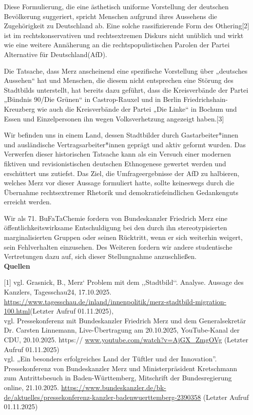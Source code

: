 \documentclass[DIV=calc]{scrartcl}
\let\oldgrqq=\grqq
\def\grqq{\oldgrqq\xspace}
\begin{document}
Diese Formulierung, die eine ästhetisch uniforme Vorstellung der deutschen Bevölkerung suggeriert, 
spricht Menschen aufgrund ihres Aussehens die Zugehörigkeit zu Deutschland ab. Eine solche 
rassifizierende Form des Othering[2] ist im rechtskonservativen und rechtsextremen Diskurs nicht 
unüblich und wirkt wie eine weitere Annäherung an die rechtspopulistischen Parolen der Partei 
\glqq Alternative für Deutschland\grqq (AfD).

Die Tatsache, dass Merz anscheinend eine spezifische Vorstellung über „deutsches Aussehen“ hat und 
Menschen, die diesem nicht entsprechen eine Störung des Stadtbilds unterstellt, hat bereits dazu geführt, 
dass die Kreisverbände der Partei „Bündnis 90/Die Grünen“ in Castrop-Rauxel und in Berlin 
Friedrichshain-Kreuzberg wie auch die Kreisverbände der Partei „Die Linke“ in Bochum und Essen und 
Einzelpersonen ihn wegen Volksverhetzung angezeigt haben.[3]

Wir befinden uns in einem Land, dessen Stadtbilder durch Gastarbeiter*innen und ausländische 
Vertragsarbeiter*innen geprägt und aktiv geformt wurden. Das Verwerfen dieser historischen Tatsache 
kann als ein Versuch einer modernen fiktiven und revisionistischen \glqq deutschen \grqq Ethnogenese gewertet 
werden und erschüttert uns zutiefst. Das Ziel, die Umfrageergebnisse der AfD zu halbieren, welches Merz 
vor dieser Aussage formuliert hatte, sollte keineswegs durch die Übernahme rechtsextremer Rhetorik und 
demokratiefeindlichen Gedankenguts erreicht werden.

Wir als 71. BuFaTaChemie fordern von Bundeskanzler Friedrich Merz eine öffentlichkeitswirksame 
Entschuldigung bei den durch ihn stereotypisierten marginalisierten Gruppen oder seinen Rücktritt, wenn 
er sich weiterhin weigert, sein Fehlverhalten einzusehen.
Des Weiteren fordern wir andere studentische Vertretungen dazu auf, sich dieser Stellungnahme anzuschließen.\\

\textbf{Quellen}

[1] vgl. Grasnick, B., Merz‘ Problem mit dem ,,Stadtbild‘‘. Analyse. Aussage des Kanzlers, Tagesschau24, 
17.10.2025. \url{https://www.tagesschau.de/inland/innenpolitik/merz-stadtbild-migration-100.html}(Letzter
Aufruf 01.11.2025), \\vgl. Pressekonferenz mit Bundeskanzler Friedrich Merz und dem Generalsekretär Dr. 
Carsten Linnemann, Live-Übertragung am 20.10.2025, YouTube-Kanal der CDU, 20.10.2025. https://
\url{www.youtube.com/watch?v=AjGX_ZmgOVg} (Letzter Aufruf 01.11.2025) \\vgl. „Ein besonders erfolgreiches Land 
der Tüftler und der Innovation”. Pressekonferenz von Bundeskanzler Merz und Ministerpräsident 
Kretschmann zum Antrittsbesuch in Baden-Württemberg, Mitschrift der Bundesregierung online, 
21.10.2025. \url{https://www.bundeskanzler.de/bk-de/aktuelles/pressekonferenz-kanzler-badenwuerttemberg-2390358} (Letzter Aufruf 01.11.2025)
\end{document}
